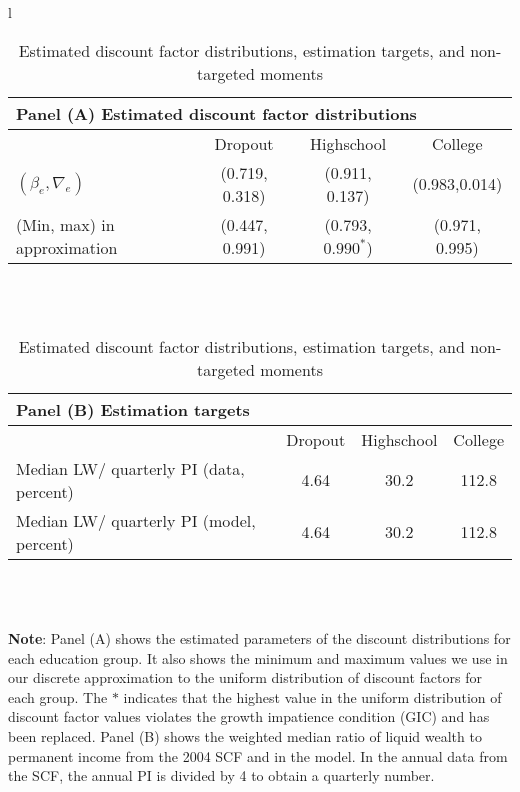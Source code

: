 \documentclass[\econtexRoot/HAFiscal]{subfiles}
\begin{document}
\begin{table}[th]
  \begin{center}
    \begin{tabular}{l}
      \begin{tabular}{lccc}
        \multicolumn{4}{l}{Panel (A) Estimated discount factor distributions} \\ \midrule
        & Dropout & Highschool & College \\ \midrule
        $(\beta_e, \nabla_e)$ & (0.719, 0.318) & (0.911, 0.137) & (0.983,0.014) \\
        (Min, max) in approximation & (0.447, 0.991) & (0.793, $0.990^*$) & (0.971, 0.995) \\
        \midrule 
      \end{tabular} \\ \\ 
      
      \begin{tabular}{lccc}
        \multicolumn{4}{l}{Panel (B) Estimation targets} \\ \midrule
        & Dropout & Highschool & College \\ \midrule
        Median LW/ quarterly PI (data, percent) & 4.64 & 30.2 & 112.8 \\ 
        Median LW/ quarterly PI (model, percent) & 4.64 & 30.2 & 112.8 %
        \\ \midrule 
      \end{tabular} \\ \\ 
    \end{tabular}
    \caption{Estimated discount factor distributions, estimation targets, and non-targeted moments}
    \notinsubfile{\label{tab:estimBetas}}
    \parbox{16cm}{\small \vspace{.15cm} \textbf{Note}: Panel (A) shows the estimated parameters of the discount distributions for each education group. It also shows the minimum and maximum values we use in our discrete approximation to the uniform distribution of discount factors for each group. The $*$ indicates that the highest value in the uniform distribution of discount factor values violates the growth impatience condition (GIC) and has been replaced. Panel (B) shows the weighted median ratio of liquid wealth to permanent income from the 2004 SCF and in the model. In the annual data from the SCF, the annual PI is divided by 4 to obtain a quarterly number.\normalsize}
  \end{center}
\end{table}
\end{document}
